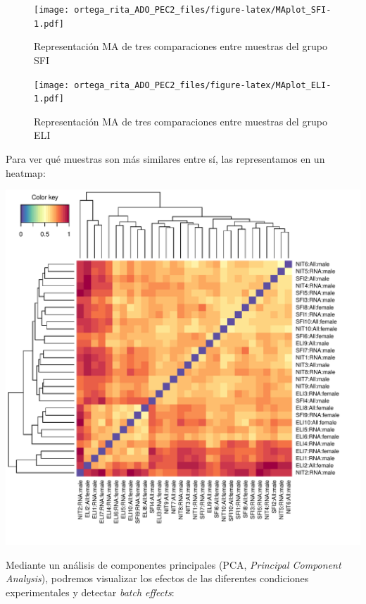 \documentclass[
  english,
]{article}
\begin{document}
\begin{figure}
\centering
\texttt{[image: ortega\_rita\_ADO\_PEC2\_files/figure-latex/MAplot\_SFI-1.pdf]}
\caption{Representación MA de tres comparaciones entre muestras del
grupo SFI}
\end{figure}

\begin{figure}
\centering
\texttt{[image: ortega\_rita\_ADO\_PEC2\_files/figure-latex/MAplot\_ELI-1.pdf]}
\caption{Representación MA de tres comparaciones entre muestras del
grupo ELI}
\end{figure}

Para ver qué muestras son más similares entre sí, las representamos en
un heatmap:

\includegraphics{ortega_rita_ADO_PEC2_files/figure-latex/heatmap_pseudocount-1.pdf}

Mediante un análisis de componentes principales (PCA, \emph{Principal
Component Analysis}), podremos visualizar los efectos de las diferentes
condiciones experimentales y detectar \emph{batch effects}:
\end{document}
